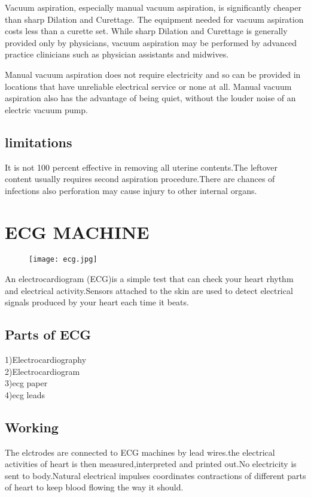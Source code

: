 \documentclass[12pt]{article}
\begin{document}
Vacuum aspiration, especially manual vacuum aspiration, is significantly cheaper than sharp Dilation and Curettage. The equipment needed for vacuum aspiration costs less than a curette set. While sharp Dilation and Curettage is generally provided only by physicians, vacuum aspiration may be performed by advanced practice clinicians such as physician assistants and midwives.

Manual vacuum aspiration does not require electricity and so can be provided in locations that have unreliable electrical service or none at all. Manual vacuum aspiration also has the advantage of being quiet, without the louder noise of an electric vacuum pump.
\subsection{limitations}
It is not 100 percent effective in removing all uterine contents.The leftover content usually requires second aspiration procedure.There are chances of infections also perforation may cause injury to other internal organs.
\section{ECG MACHINE}
\begin{figure}
\centering
\texttt{[image: ecg.jpg]}
\end{figure}
An electrocardiogram (ECG)is a simple test that can check your heart rhythm and electrical activity.Sensors attached to the skin are used to detect electrical signals produced by your heart each time it beats.
\subsection{Parts of ECG}
1)Electrocardiography\\2)Electrocardiogram\\3)ecg paper\\4)ecg leads
\subsection{Working}
The elctrodes are connected to ECG machines by lead wires.the electrical activities of heart is then measured,interpreted and printed out.No electricity is sent to body.Natural electrical impulses coordinates contractions of different parts of heart to keep blood flowing the way it should.
\end{document}
